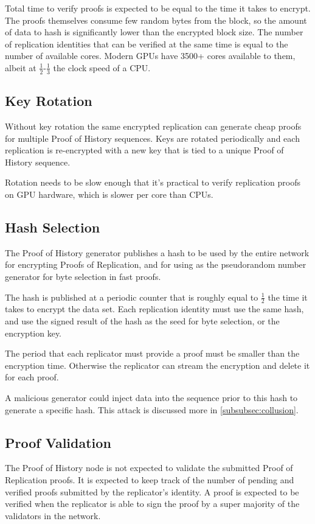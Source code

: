 \documentclass[12pt]{article}
\begin{document}
Total time to verify proofs is expected to be equal to the time it takes to encrypt. The proofs themselves consume few random bytes from the block, so the amount of data to hash is significantly lower than the encrypted block size. The number of replication identities that can be verified at the same time is equal to the number of available cores. Modern GPUs have 3500+ cores available to them, albeit at \(\frac{1}{2}\)-\(\frac{1}{3}\) the clock speed of a CPU.

\subsection{Key Rotation}

Without key rotation the same encrypted replication can generate cheap proofs for multiple Proof of History sequences. Keys are rotated periodically and each replication is re-encrypted with a new key that is tied to a unique Proof of History sequence.

Rotation needs to be slow enough that it’s practical to verify replication proofs on GPU hardware, which is slower per core than CPUs.

\subsection{Hash Selection}\label{hashselection}

The Proof of History generator publishes a hash to be used by the entire network for encrypting Proofs of Replication, and for using as the pseudorandom number generator for byte selection in fast proofs.

The hash is published at a periodic counter that is roughly equal to \(\frac{1}{2}\) the time it takes to encrypt the data set. Each replication identity must use the same hash, and use the signed result of the hash as the seed for byte selection, or the encryption key.

The period that each replicator must provide a proof must be smaller than the encryption time. Otherwise the replicator can stream the encryption and delete it for each proof.

A malicious generator could inject data into the sequence prior to this hash to generate a specific hash. This attack is discussed more in \ref{subsubsec:collusion}.

\subsection{Proof Validation}
The Proof of History node is not expected to validate the submitted Proof of Replication proofs. It is expected to keep track of the number of pending and verified proofs submitted by the replicator’s identity. A proof is expected to be verified when the replicator is able to sign the proof by a super majority of the validators in the network.
\end{document}
